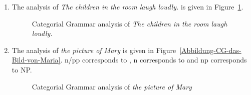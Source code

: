 \largerpage
\begin{enumerate}
\item The analysis of \emph{The children in the room laugh loudly.} is given in Figure~\ref{Abbildung-CG-Kinder-lachen-laut}.
\begin{figure}[H]
\centerline{%
}
\caption{\label{Abbildung-CG-Kinder-lachen-laut}Categorial Grammar analysis of \emph{The children in
    the room laugh loudly.}}
\end{figure}%

\item The analysis of \emph{the picture of Mary} is given in
  Figure~\vref{Abbildung-CG-das-Bild-von-Maria}. n/pp corresponds to \nnull, n corresponds to \nbar
  and np corresponds to NP.
\begin{figure}[H]
\centerline{%
}
\caption{Categorial Grammar analysis of \emph{the picture of Mary}\label{Abbildung-CG-das-Bild-von-Maria}}
\end{figure}%
\end{enumerate}

